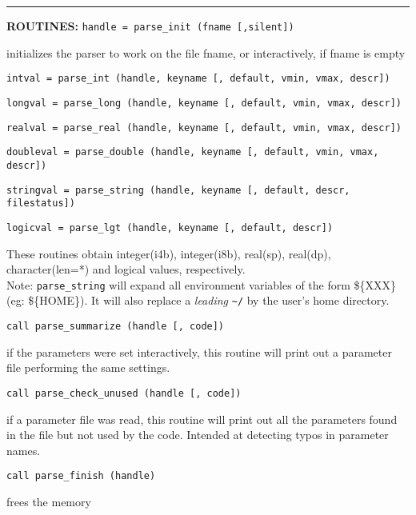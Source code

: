 \newpage

\rule{\hsize}{0.7mm}
\textsc{\large{\textbf{ROUTINES: }}}\hfill\newline
{\tt handle = parse\_init (fname [,silent])} 

\quad initializes the parser to work on the file fname, or interactively, if fname is empty

{\tt intval = parse\_int (handle, keyname [, default, vmin, vmax, descr])} 

{\tt longval = parse\_long (handle, keyname [, default, vmin, vmax, descr])} 

{\tt realval = parse\_real (handle, keyname [, default, vmin, vmax, descr])} 

{\tt doubleval = parse\_double (handle, keyname [, default, vmin, vmax, descr])} 

{\tt stringval = parse\_string (handle, keyname [, default, descr, filestatus])} 

{\tt logicval = parse\_lgt (handle, keyname [, default, descr])} 

\quad These routines obtain integer(i4b), integer(i8b), real(sp), real(dp), character(len=*) and logical values,
respectively. \\
Note: {\tt parse\_string} will expand all environment variables of
the form \$\{XXX\} (eg: \$\{HOME\}). It will also replace a {\em leading} 
\verb+~+$\!${\tt /}
by the user's home directory.

{\tt call parse\_summarize (handle [, code])}

\quad if the parameters were set interactively, this routine will print out a 
parameter file performing the same settings.

{\tt call parse\_check\_unused (handle [, code])}

\quad if a parameter file was read, this routine will print out all the parameters
found in the file but not used by the code. Intended at detecting typos in
parameter names.

{\tt call parse\_finish (handle)}

\quad frees the memory

